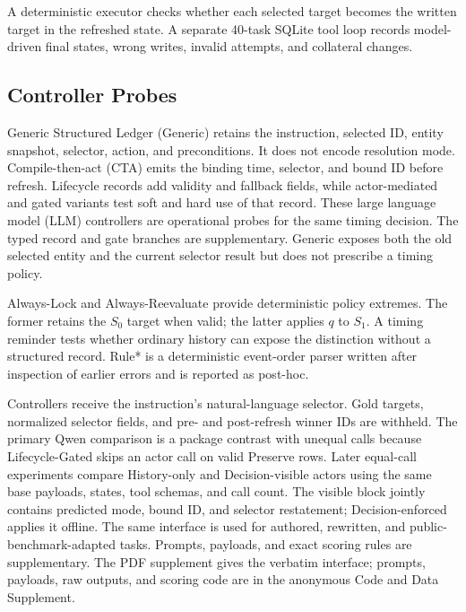 \documentclass[letterpaper]{article}
\begin{document}
A deterministic executor checks whether each selected target becomes the written target in the
refreshed state. A separate 40-task SQLite tool loop records model-driven final states, wrong
writes, invalid attempts, and collateral changes.

\subsection{Controller Probes}
Generic Structured Ledger (Generic) retains the instruction, selected ID, entity snapshot,
selector, action, and preconditions. It does not encode resolution mode. Compile-then-act (CTA)
emits the binding time, selector, and bound ID before refresh. Lifecycle records add validity and
fallback fields, while actor-mediated and gated variants test soft and hard use of that record.
These large language model (LLM) controllers are operational probes for the same timing decision.
The typed record and gate branches are supplementary. Generic exposes both the old selected entity
and the current selector result but does not prescribe a timing policy.

Always-Lock and Always-Reevaluate provide deterministic policy extremes. The former retains the
$S_0$ target when valid; the latter applies $q$ to $S_1$. A timing reminder tests whether ordinary
history can expose the distinction without a structured record. Rule* is a deterministic
event-order parser written after inspection of earlier errors and is reported as post-hoc.

Controllers receive the instruction's natural-language selector. Gold targets, normalized
selector fields, and pre- and post-refresh winner IDs are withheld. The primary Qwen comparison is
a package contrast with unequal calls because Lifecycle-Gated skips an actor call on valid Preserve
rows. Later equal-call experiments compare History-only and Decision-visible actors using the same
base payloads, states, tool schemas, and call count. The visible block jointly contains predicted
mode, bound ID, and selector restatement; Decision-enforced applies it offline. The same interface
is used for authored, rewritten, and public-benchmark-adapted tasks. Prompts, payloads, and exact
scoring rules are supplementary. The PDF supplement gives the verbatim interface; prompts,
payloads, raw outputs, and scoring code are in the anonymous Code and Data Supplement.
\end{document}
